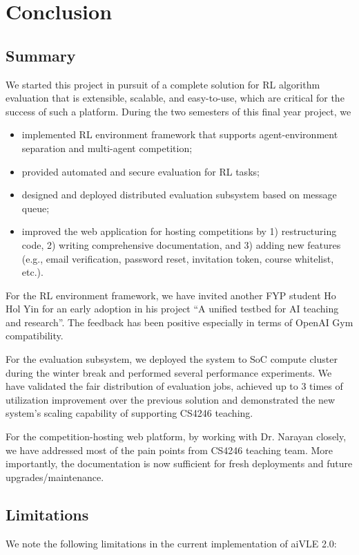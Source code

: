 \chapter{Conclusion}
\label{ch:conclusion}

\section{Summary}
\label{s:conclusion-summary}
We started this project in pursuit of a complete solution for RL algorithm evaluation that is extensible, scalable, and easy-to-use, which are critical for the success of such a platform. During the two semesters of this final year project, we
\begin{itemize}
    \item implemented RL environment framework that supports agent-environment separation and multi-agent competition;
    \item provided automated and secure evaluation for RL tasks;
    \item designed and deployed distributed evaluation subsystem based on message queue;
    \item improved the web application for hosting competitions by 1) restructuring code, 2) writing comprehensive documentation, and 3) adding new features (e.g., email verification, password reset, invitation token, course whitelist, etc.).
\end{itemize}

For the RL environment framework, we have invited another FYP student Ho Hol Yin for an early adoption in his project ``A unified testbed for AI teaching and research''. The feedback has been positive especially in terms of OpenAI Gym compatibility.

For the evaluation subsystem, we deployed the system to SoC compute cluster during the winter break and performed several performance experiments. We have validated the fair distribution of evaluation jobs, achieved up to 3 times of utilization improvement over the previous solution and demonstrated the new system’s scaling capability of supporting CS4246 teaching.

For the competition-hosting web platform, by working with Dr. Narayan closely, we have addressed most of the pain points from CS4246 teaching team. More importantly, the documentation is now sufficient for fresh deployments and future upgrades/maintenance.

\section{Limitations}
\label{s:conclusion-limitations}
We note the following limitations in the current implementation of aiVLE 2.0:

